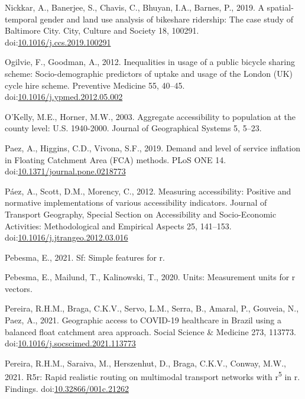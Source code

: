 \documentclass[]{elsarticle} %
\begin{document}
\leavevmode\hypertarget{ref-nickkarSpatialtemporalGenderLand2019}{}%
Nickkar, A., Banerjee, S., Chavis, C., Bhuyan, I.A., Barnes, P., 2019. A
spatial-temporal gender and land use analysis of bikeshare ridership:
The case study of Baltimore City. City, Culture and Society 18, 100291.
doi:\href{https://doi.org/10.1016/j.ccs.2019.100291}{10.1016/j.ccs.2019.100291}

\leavevmode\hypertarget{ref-ogilvieInequalitiesUsagePublic2012}{}%
Ogilvie, F., Goodman, A., 2012. Inequalities in usage of a public
bicycle sharing scheme: Socio-demographic predictors of uptake and usage
of the London (UK) cycle hire scheme. Preventive Medicine 55, 40--45.
doi:\href{https://doi.org/10.1016/j.ypmed.2012.05.002}{10.1016/j.ypmed.2012.05.002}

\leavevmode\hypertarget{ref-okelly2003aggregate}{}%
O'Kelly, M.E., Horner, M.W., 2003. Aggregate accessibility to population
at the county level: U.S. 1940-2000. Journal of Geographical Systems 5,
5--23.

\leavevmode\hypertarget{ref-paezDemandLevelService2019}{}%
Paez, A., Higgins, C.D., Vivona, S.F., 2019. Demand and level of service
inflation in Floating Catchment Area (FCA) methods. PLoS ONE 14.
doi:\href{https://doi.org/10.1371/journal.pone.0218773}{10.1371/journal.pone.0218773}

\leavevmode\hypertarget{ref-paezMeasuringAccessibilityPositive2012}{}%
Páez, A., Scott, D.M., Morency, C., 2012. Measuring accessibility:
Positive and normative implementations of various accessibility
indicators. Journal of Transport Geography, Special Section on
Accessibility and Socio-Economic Activities: Methodological and
Empirical Aspects 25, 141--153.
doi:\href{https://doi.org/10.1016/j.jtrangeo.2012.03.016}{10.1016/j.jtrangeo.2012.03.016}

\leavevmode\hypertarget{ref-R-sf}{}%
Pebesma, E., 2021. Sf: Simple features for r.

\leavevmode\hypertarget{ref-R-units}{}%
Pebesma, E., Mailund, T., Kalinowski, T., 2020. Units: Measurement units
for r vectors.

\leavevmode\hypertarget{ref-pereiraGeographicAccessCOVID192021}{}%
Pereira, R.H.M., Braga, C.K.V., Servo, L.M., Serra, B., Amaral, P.,
Gouveia, N., Paez, A., 2021. Geographic access to COVID-19 healthcare in
Brazil using a balanced float catchment area approach. Social Science \&
Medicine 273, 113773.
doi:\href{https://doi.org/10.1016/j.socscimed.2021.113773}{10.1016/j.socscimed.2021.113773}

\leavevmode\hypertarget{ref-Pereira2021r5r}{}%
Pereira, R.H.M., Saraiva, M., Herszenhut, D., Braga, C.K.V., Conway,
M.W., 2021. R5r: Rapid realistic routing on multimodal transport
networks with r\textsuperscript{5} in r. Findings.
doi:\href{https://doi.org/10.32866/001c.21262}{10.32866/001c.21262}
\end{document}
